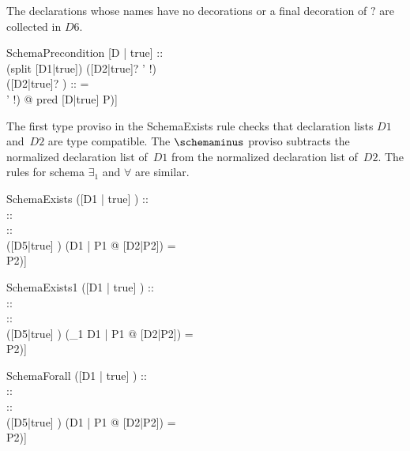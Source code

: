 The declarations whose names have no decorations or a final decoration
of $?$ are collected in $D6$.

\begin{zedrule}{SchemaPrecondition}
  [D | true] :: \power [D1 | true] \\
  (split [D1|true]) \is ([D2|true]? \land [D3|true] \land
                         [D4|true]' \land [D5|true]!) \\
  ([D2|true]? \land [D3|true]) :: \power [D6|true]
\derives
  \pre [D|P] = \\
  [D6 | (\exists ([D4|true]' \land [D5|true]!) @ pred [D|true] \land P)]
\end{zedrule}

The first type proviso in the SchemaExists rule checks that
declaration lists $D1$ and~$D2$ are type compatible.  The
$\schemaminus$ proviso subtracts the normalized declaration list
of~$D1$ from the normalized declaration list of~$D2$.  The rules for
schema $\exists_1$ and $\forall$ are similar.


\begin{zedrule}{SchemaExists}
   ([D1 | true] \land [D2 | true]) :: \power [D3 | true] \\
   [D1|true] :: \power [D4|true] \\
   [D2|true] :: \power [D5|true] \\
   ([D5|true] \schemaminus [D4|true]) \is [D6|true]
\derives
   (\exists D1 | P1 @ [D2|P2]) = \\
   [D6 | (\exists D1 @ P1 \land pred [D2|true] \land P2)]
\end{zedrule}

\begin{zedrule}{SchemaExists1}
   ([D1 | true] \land [D2 | true]) :: \power [D3 | true] \\
   [D1|true] :: \power [D4|true] \\
   [D2|true] :: \power [D5|true] \\
   ([D5|true] \schemaminus [D4|true]) \is [D6|true]
\derives
   (\exists_1 D1 | P1 @ [D2|P2]) = \\
   [D6 | (\exists_1 D1 @ P1 \land pred [D2|true] \land P2)]
\end{zedrule}


\begin{zedrule}{SchemaForall}
   ([D1 | true] \land [D2 | true]) :: \power [D3 | true] \\
   [D1|true] :: \power [D4|true] \\
   [D2|true] :: \power [D5|true] \\
   ([D5|true] \schemaminus [D4|true]) \is [D6|true]
\derives
   (\forall D1 | P1 @ [D2|P2]) = \\
   [D6 | (\forall D1 @ P1 \land pred [D2|true] \land P2)]
\end{zedrule}


